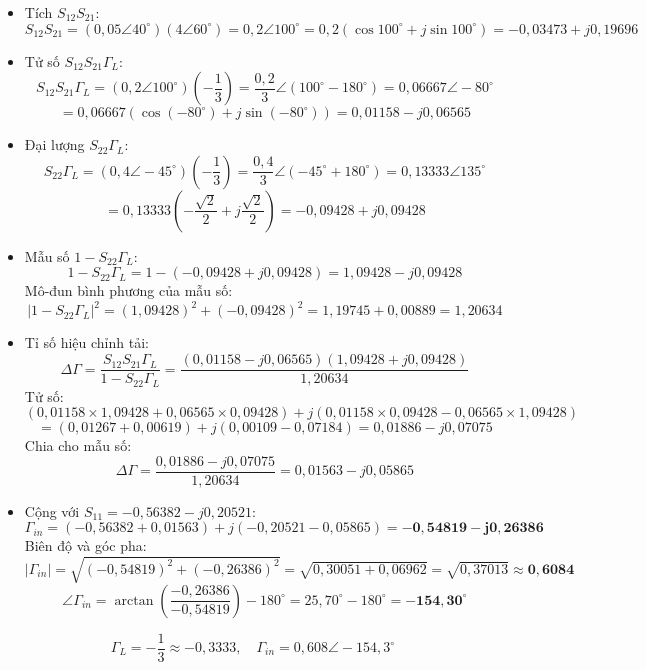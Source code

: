 \documentclass[12pt,a4paper]{article}
\begin{document}
\begin{itemize}
    \item Tích $S_{12}S_{21}$:
    \[
    S_{12}S_{21} = (0{,}05\angle 40^\circ)(4\angle 60^\circ) = 0{,}2 \angle 100^\circ = 0{,}2(\cos 100^\circ + j\sin 100^\circ) = -0{,}03473 + j0{,}19696
    \]
    \item Tử số $S_{12}S_{21}\Gamma_L$:
    \[
    S_{12}S_{21}\Gamma_L = (0{,}2\angle 100^\circ) \left(-\frac{1}{3}\right) = \frac{0{,}2}{3} \angle (100^\circ - 180^\circ) = 0{,}06667 \angle -80^\circ
    \]
    \[
    = 0{,}06667(\cos(-80^\circ) + j\sin(-80^\circ)) = 0{,}01158 - j0{,}06565
    \]
    \item Đại lượng $S_{22}\Gamma_L$:
    \[
    S_{22}\Gamma_L = (0{,}4\angle -45^\circ) \left(-\frac{1}{3}\right) = \frac{0{,}4}{3} \angle (-45^\circ + 180^\circ) = 0{,}13333 \angle 135^\circ
    \]
    \[
    = 0{,}13333\left(-\frac{\sqrt{2}}{2} + j\frac{\sqrt{2}}{2}\right) = -0{,}09428 + j0{,}09428
    \]
    \item Mẫu số $1 - S_{22}\Gamma_L$:
    \[
    1 - S_{22}\Gamma_L = 1 - (-0{,}09428 + j0{,}09428) = 1{,}09428 - j0{,}09428
    \]
    Mô-đun bình phương của mẫu số:
    \[
    |1 - S_{22}\Gamma_L|^2 = (1{,}09428)^2 + (-0{,}09428)^2 = 1{,}19745 + 0{,}00889 = 1{,}20634
    \]
    \item Tỉ số hiệu chỉnh tải:
    \[
    \Delta \Gamma = \frac{S_{12}S_{21}\Gamma_L}{1 - S_{22}\Gamma_L} = \frac{(0{,}01158 - j0{,}06565)(1{,}09428 + j0{,}09428)}{1{,}20634}
    \]
    Tử số:
    \[
    (0{,}01158 \times 1{,}09428 + 0{,}06565 \times 0{,}09428) + j(0{,}01158 \times 0{,}09428 - 0{,}06565 \times 1{,}09428)
    \]
    \[
    = (0{,}01267 + 0{,}00619) + j(0{,}00109 - 0{,}07184) = 0{,}01886 - j0{,}07075
    \]
    Chia cho mẫu số:
    \[
    \Delta \Gamma = \frac{0{,}01886 - j0{,}07075}{1{,}20634} = 0{,}01563 - j0{,}05865
    \]
    \item Cộng với $S_{11} = -0{,}56382 - j0{,}20521$:
    \[
    \Gamma_{in} = (-0{,}56382 + 0{,}01563) + j(-0{,}20521 - 0{,}05865) = \mathbf{-0{,}54819 - j0{,}26386}
    \]
    Biên độ và góc pha:
    \[
    |\Gamma_{in}| = \sqrt{(-0{,}54819)^2 + (-0{,}26386)^2} = \sqrt{0{,}30051 + 0{,}06962} = \sqrt{0{,}37013} \approx \mathbf{0{,}6084}
    \]
    \[
    \angle \Gamma_{in} = \arctan\left(\frac{-0{,}26386}{-0{,}54819}\right) - 180^\circ = 25{,}70^\circ - 180^\circ = \mathbf{-154{,}30^\circ}
    \]
\end{itemize}
\[
\boxed{\Gamma_L = -\frac{1}{3} \approx -0{,}3333, \quad \Gamma_{in} = 0{,}608\angle -154{,}3^\circ}
\]
\end{document}
